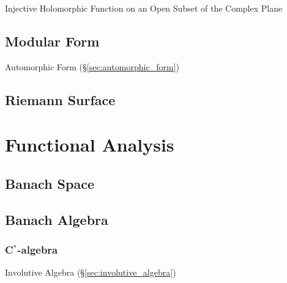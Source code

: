 Injective Holomorphic Function on an Open Subset of the Complex Plane



\subsection{Modular Form}\label{sec:modular_form}

Automorphic Form (\S\ref{sec:automorphic_form})



\subsection{Riemann Surface}\label{sec:riemann_surface}



\section{Functional Analysis}\label{sec:functional_analysis}

\subsection{Banach Space}\label{sec:banach_space}

\subsection{Banach Algebra}\label{sec:banach_algebra}

\subsubsection{C$^*$-algebra}\label{sec:cstar_algebra}

Involutive Algebra (\S\ref{sec:involutive_algebra})

